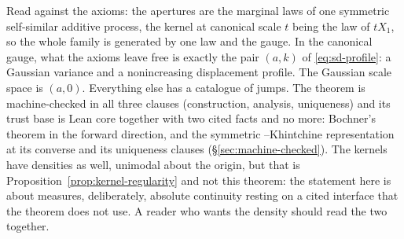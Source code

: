 Read against the axioms: the apertures are the marginal laws of one symmetric self-similar
additive process, the kernel at canonical scale $t$ being the law of $tX_1$, so the whole
family is generated by one law and the gauge. In the canonical gauge, what the axioms leave
free is exactly the pair $(a,k)$ of \ref{eq:sd-profile}: a Gaussian variance and a
nonincreasing displacement profile.
The Gaussian scale space is $(a,0)$. Everything else has a catalogue of jumps. The theorem is
machine-checked in all three clauses (construction, analysis, uniqueness) and its trust
base is Lean core together with two cited facts and no more: Bochner's theorem in the forward
direction, and the symmetric \Levy--Khintchine representation at its converse and its
uniqueness clauses (\S\ref{sec:machine-checked}). The kernels have densities as well,
unimodal about the origin, but that is Proposition~\ref{prop:kernel-regularity} and not this
theorem: the statement here is about measures, deliberately, absolute continuity resting on a
cited interface that the theorem does not use. A reader who wants the density should read the
two together.

